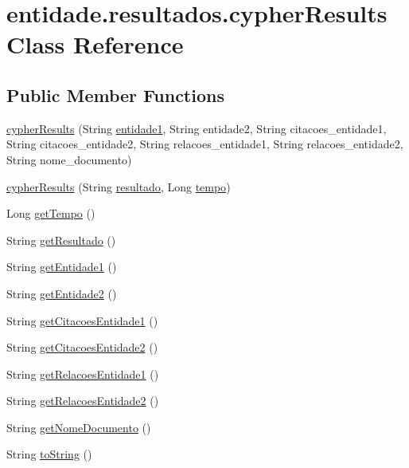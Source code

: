 \hypertarget{classentidade_1_1resultados_1_1cypherResults}{}\section{entidade.\+resultados.\+cypher\+Results Class Reference}
\label{classentidade_1_1resultados_1_1cypherResults}
\subsection*{Public Member Functions}
\begin{DoxyCompactItemize}
\item 
\hyperlink{classentidade_1_1resultados_1_1cypherResults_aa6fe60ac9bde49616bfdcae4584612ca}{cypher\+Results} (String \hyperlink{classentidade_1_1resultados_1_1cypherResults_a9baf0ede3f9f4ee7aa7c6863033b9e5c}{entidade1}, String entidade2, String citacoes\+\_\+entidade1, String citacoes\+\_\+entidade2, String relacoes\+\_\+entidade1, String relacoes\+\_\+entidade2, String nome\+\_\+documento)
\item 
\hyperlink{classentidade_1_1resultados_1_1cypherResults_a5582207c17ecffee1196df3f582a3694}{cypher\+Results} (String \hyperlink{classentidade_1_1resultados_1_1cypherResults_af77782dbcb06c64d5d2d0b387bc9fd09}{resultado}, Long \hyperlink{classentidade_1_1resultados_1_1cypherResults_a98c868396c9a666d35d2a4fd9adc2e2d}{tempo})
\item 
Long \hyperlink{classentidade_1_1resultados_1_1cypherResults_a9555f9aab56a0a1c42cce96da183dc01}{get\+Tempo} ()
\item 
String \hyperlink{classentidade_1_1resultados_1_1cypherResults_a4fb71afa8fcecc6a5f34a81dc9457514}{get\+Resultado} ()
\item 
String \hyperlink{classentidade_1_1resultados_1_1cypherResults_a96b375e44f9c6ca3991981adfe5b0ae9}{get\+Entidade1} ()
\item 
String \hyperlink{classentidade_1_1resultados_1_1cypherResults_a3b71305929339a1feb95b98dc3932158}{get\+Entidade2} ()
\item 
String \hyperlink{classentidade_1_1resultados_1_1cypherResults_a3f9d461ed5dc60198a4cb09a7c39a992}{get\+Citacoes\+Entidade1} ()
\item 
String \hyperlink{classentidade_1_1resultados_1_1cypherResults_a8e4a4d50083315d7eb19a55d43c3b2e7}{get\+Citacoes\+Entidade2} ()
\item 
String \hyperlink{classentidade_1_1resultados_1_1cypherResults_a4da90baa7d0c37931e4f7602fdf69382}{get\+Relacoes\+Entidade1} ()
\item 
String \hyperlink{classentidade_1_1resultados_1_1cypherResults_a5d5b2eac46cb5c6defe26610f8a7b7cf}{get\+Relacoes\+Entidade2} ()
\item 
String \hyperlink{classentidade_1_1resultados_1_1cypherResults_af126305c04727e92719c7ccdc243683c}{get\+Nome\+Documento} ()
\item 
String \hyperlink{classentidade_1_1resultados_1_1cypherResults_abd2c774d19f2378d5e6e635ce155224b}{to\+String} ()
\end{DoxyCompactItemize}
